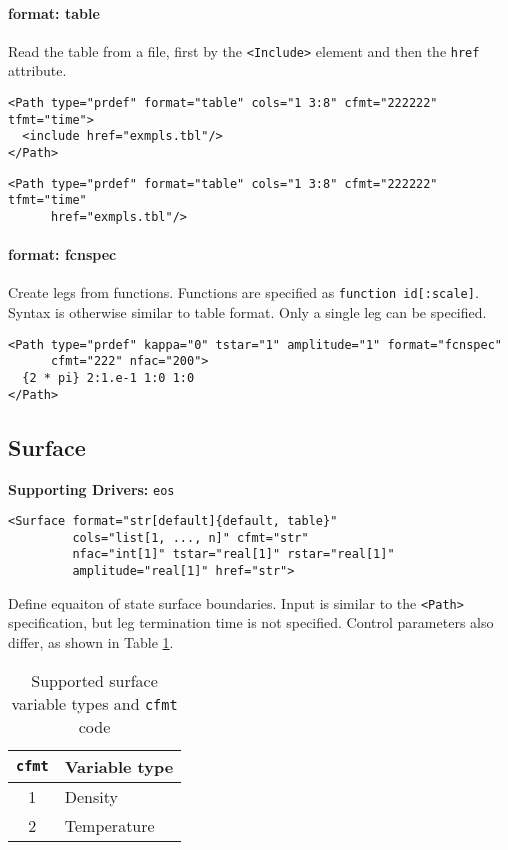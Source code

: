 \documentclass[11pt]{report}
\newcommand{\tag}[1]{\texttt{<#1>}}
\newcommand{\supporting}[1]{\textbf{Supporting Drivers: }\texttt{#1}}
\begin{document}
\paragraph{format: table} Read the table from a file, first by the
\tag{Include} element and then the \texttt{href} attribute.
\begin{verbatim}
<Path type="prdef" format="table" cols="1 3:8" cfmt="222222" tfmt="time">
  <include href="exmpls.tbl"/>
</Path>
\end{verbatim}

\begin{verbatim}
<Path type="prdef" format="table" cols="1 3:8" cfmt="222222" tfmt="time"
      href="exmpls.tbl"/>
\end{verbatim}

\paragraph{format: fcnspec} Create legs from functions. Functions are specified
as \texttt{function id[:scale]}.  Syntax is otherwise similar to table format.
Only a single leg can be specified.
\begin{verbatim}
<Path type="prdef" kappa="0" tstar="1" amplitude="1" format="fcnspec"
      cfmt="222" nfac="200">
  {2 * pi} 2:1.e-1 1:0 1:0
</Path>
\end{verbatim}

\subsection{Surface}
\supporting{eos}
\begin{verbatim}
<Surface format="str[default]{default, table}"
         cols="list[1, ..., n]" cfmt="str"
         nfac="int[1]" tstar="real[1]" rstar="real[1]"
         amplitude="real[1]" href="str">
\end{verbatim}
%
Define equaiton of state surface boundaries.  Input is similar to the
\tag{Path} specification, but leg termination time is not specified.  Control
parameters also differ, as shown in Table \ref{tab:cfmt-1}.

\begin{table}[h!]
  \centering
  \begin{tabular}[h]{cl}
    \hline
    \hline
    \texttt{cfmt} & Variable type \\
    \hline
    1 & Density \\
    2 & Temperature
  \end{tabular}
  \caption{Supported surface variable types and \texttt{cfmt} code}
  \label{tab:cfmt-1}
\end{table}
\end{document}
